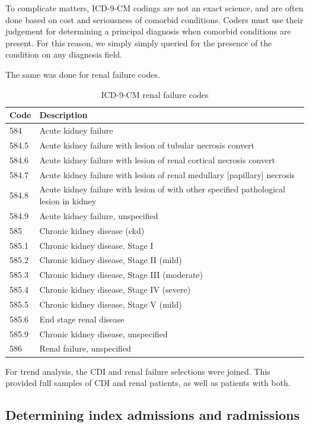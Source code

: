 \documentclass[12pt]{ociamthesis}\usepackage[]{graphicx}\usepackage[]{color}
\begin{document}
To complicate matters, ICD-9-CM codings are not an exact science, and are often done based on cost and seriousness of comorbid conditions. Coders must use
their judgement for determining a principal diagnosis when comorbid conditions are present. \cite{Avery2011} For this reason, we simply simply queried for
the presence of the condition on any diagnosis field. 

The same was done for renal failure codes.

\begin{table}[]
\centering
\caption{ICD-9-CM renal failure codes}
\label{icd9renal}
\begin{tabular}{ll}
Code  & Description          \\
\hline
584   & Acute kidney failure \\
584.5 &	Acute kidney failure with lesion of tubular necrosis convert \\
584.6 &	Acute kidney failure with lesion of renal cortical necrosis convert \\
584.7 &	Acute kidney failure with lesion of renal medullary [papillary] necrosis \\
584.8 &	Acute kidney failure with lesion of with other specified pathological lesion in kidney \\
584.9 &	Acute kidney failure, unspecified \\
585   & Chronic kidney disease (ckd) \\
585.1 &	Chronic kidney disease, Stage I \\
585.2 &	Chronic kidney disease, Stage II (mild) \\
585.3 &	Chronic kidney disease, Stage III (moderate) \\
585.4 &	Chronic kidney disease, Stage IV (severe) \\
585.5 &	Chronic kidney disease, Stage V (mild) \\
585.6 &	End stage renal disease \\
585.9 &	Chronic kidney disease, unspecified \\
586   &	Renal failure, unspecified \\
\end{tabular}
\end{table}

For trend analysis, the CDI and renal failure selections were joined. This provided full samples of
CDI and renal patients, as well as patients with both.


\subsection{Determining index admissions and radmissions}
\end{document}
